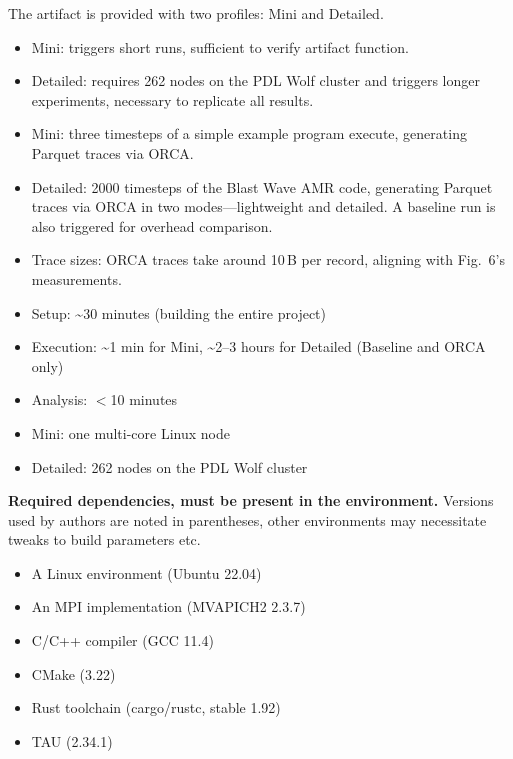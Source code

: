 \documentclass[nonacm,sigconf]{acmart}
\newcommand{\profmini}{\textsf{Mini}}
\newcommand{\profdet}{\textsf{Detailed}}
\begin{document}
\noindent The artifact is provided with two profiles: \profmini{} and \profdet{}.
\begin{itemize}[topsep=0pt]
	\item \profmini{}: triggers short runs, sufficient to verify artifact function.
	\item \profdet{}: requires 262 nodes on the PDL Wolf cluster and triggers longer experiments, necessary to replicate all results.
\end{itemize}

\needspace{5em}
\artexp
\begin{itemize}
	\item \profmini{}: three timesteps of a simple example program execute, generating Parquet traces via ORCA.
	\item \profdet{}: 2000 timesteps of the Blast Wave AMR code, generating Parquet traces via ORCA in two modes---lightweight and detailed. 
	A baseline run is also triggered for overhead comparison.
	\item Trace sizes: ORCA traces take around 10\,B per record, aligning with Fig.~6's measurements.
\end{itemize}

\arttime

\begin{itemize}
	\item Setup: \textasciitilde30 minutes (building the entire project)
	\item Execution: \textasciitilde1 min for \profmini{}, \textasciitilde2--3 hours for \profdet{} (Baseline and ORCA only)
	\item Analysis: $<$10 minutes
\end{itemize}

\artin


\begin{itemize}
	\item \profmini{}: one multi-core Linux node
	\item \profdet{}: 262 nodes on the PDL Wolf cluster
\end{itemize}

\mbox{}\par

\noindent\textbf{Required dependencies, must be present in the environment.}
Versions used by authors are noted in parentheses, 
other environments may necessitate tweaks to build parameters etc.

\begin{itemize}
	\item A Linux environment (Ubuntu 22.04)
	\item An MPI implementation (MVAPICH2 2.3.7)
	\item C/C++ compiler (GCC 11.4)
	\item CMake (3.22)
	\item Rust toolchain (cargo/rustc, stable 1.92)
	\item TAU (2.34.1)
\end{itemize}
\end{document}
